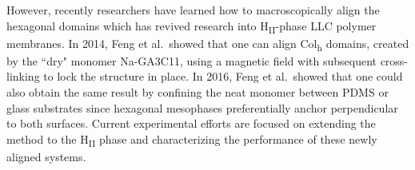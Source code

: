 \documentclass[journal=jpcbfk,manuscript=article]{achemso}
\begin{document}

  However, recently researchers have learned how to macroscopically align the
  hexagonal domains which has revived research into H\textsubscript{II}-phase LLC
  polymer membranes. In 2014, Feng et al.~showed that one can align Col\textsubscript{h}
  domains, created by the ``dry" monomer Na-GA3C11, using a magnetic field
  with subsequent cross-linking to lock the structure in
  place\cite{feng_scalable_2014}. In 2016, Feng et al.~showed that one could
  also obtain the same result by confining the neat monomer between PDMS or glass
  substrates since hexagonal mesophases preferentially anchor perpendicular to
  both surfaces\cite{feng_thin_2016}. Current experimental efforts are focused
  on extending the method to the H\textsubscript{II} phase and characterizing
  the performance of these newly aligned systems.

\end{document}
